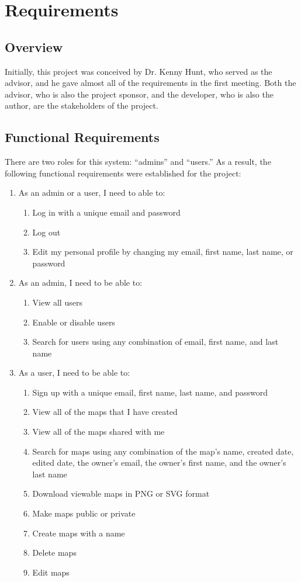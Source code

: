 \section{Requirements}
\label{sec:Requirements}

\subsection{Overview}
\label{sec:Requirements>Overview}
Initially, this project was conceived by Dr. Kenny Hunt, who served as the advisor, and he gave almost all of the requirements \cite{web:Metropolist} in the first meeting. Both the advisor, who is also the project sponsor, and the developer, who is also the author, are the stakeholders of the project.

\subsection{Functional Requirements}
\label{sec:Requirements>Functional Requirements}
There are two roles for this system: ``admins'' and ``users.'' As a result, the following functional requirements were established for the project:
\begin{enumerate}
  \item As an admin or a user, I need to able to:
  \begin{enumerate}
    \item Log in with a unique email and password
    \item Log out
    \item Edit my personal profile by changing my email, first name, last name, or password
  \end{enumerate}
  \item As an admin, I need to be able to:
  \begin{enumerate}
    \item View all users
    \item Enable or disable users
    \item Search for users using any combination of email, first name, and last name
  \end{enumerate}
  \item As a user, I need to be able to:
  \begin{enumerate}
    \item Sign up with a unique email, first name, last name, and password
    \item View all of the maps that I have created
    \item View all of the maps shared with me
    \item Search for maps using any combination of the map's name, created date, edited date, the owner's email, the owner's first name, and the owner's last name
    \item Download viewable maps in PNG or SVG format
    \item Make maps public or private
    \item Create maps with a name
    \item Delete maps
    \item Edit maps
  \end{enumerate}
\end{enumerate}

